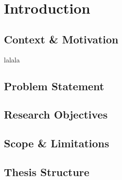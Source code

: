 \chapter{Introduction}

\section{Context \& Motivation}
lalala
\section{Problem Statement}

\section{Research Objectives}

\section{Scope \& Limitations}

\section{Thesis Structure}